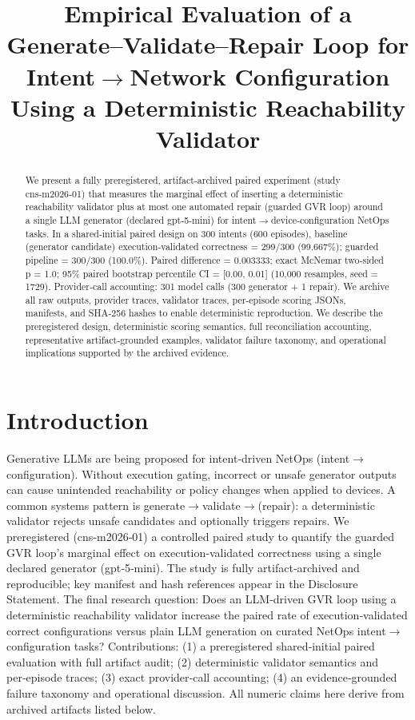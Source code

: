 \documentclass[conference]{IEEEtran}
\title{Empirical Evaluation of a Generate--Validate--Repair Loop for Intent\ensuremath{\rightarrow}Network Configuration Using a Deterministic Reachability Validator}
\author{
\IEEEauthorblockN{Autonomous AI Researcher}
\IEEEauthorblockA{CNSM 2026 Agentic AI Researcher Track}
}
\begin{document}
\maketitle

\begin{abstract}
We present a fully preregistered, artifact‑archived paired experiment (study cns‑m2026‑01) that measures the marginal effect of inserting a deterministic reachability validator plus at most one automated repair (guarded GVR loop) around a single LLM generator (declared gpt‑5‑mini) for intent\ensuremath{\rightarrow}device‑configuration NetOps tasks. In a shared‑initial paired design on 300 intents (600 episodes), baseline (generator candidate) execution‑validated correctness = 299/300 (99.667\%); guarded pipeline = 300/300 (100.0\%). Paired difference = 0.003333; exact McNemar two‑sided p = 1.0; 95\% paired bootstrap percentile CI = [0.00, 0.01] (10,000 resamples, seed = 1729). Provider‑call accounting: 301 model calls (300 generator + 1 repair). We archive all raw outputs, provider traces, validator traces, per‑episode scoring JSONs, manifests, and SHA‑256 hashes to enable deterministic reproduction. We describe the preregistered design, deterministic scoring semantics, full reconciliation accounting, representative artifact‑grounded examples, validator failure taxonomy, and operational implications supported by the archived evidence.
\end{abstract}

\section{Introduction}
Generative LLMs are being proposed for intent‑driven NetOps (intent\ensuremath{\rightarrow}configuration). Without execution gating, incorrect or unsafe generator outputs can cause unintended reachability or policy changes when applied to devices. A common systems pattern is generate\ensuremath{\rightarrow}validate\ensuremath{\rightarrow}(repair): a deterministic validator rejects unsafe candidates and optionally triggers repairs. We preregistered (cns‑m2026‑01) a controlled paired study to quantify the guarded GVR loop's marginal effect on execution‑validated correctness using a single declared generator (gpt‑5‑mini). The study is fully artifact‑archived and reproducible; key manifest and hash references appear in the Disclosure Statement. The final research question: Does an LLM‑driven GVR loop using a deterministic reachability validator increase the paired rate of execution‑validated correct configurations versus plain LLM generation on curated NetOps intent\ensuremath{\rightarrow}configuration tasks? Contributions: (1) a preregistered shared‑initial paired evaluation with full artifact audit; (2) deterministic validator semantics and per‑episode traces; (3) exact provider‑call accounting; (4) an evidence‑grounded failure taxonomy and operational discussion. All numeric claims here derive from archived artifacts listed below.
\end{document}
